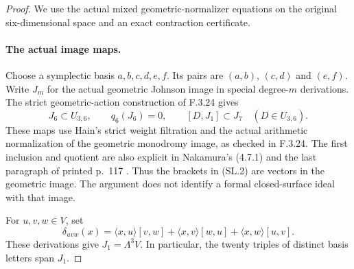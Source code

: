 \begin{proof}
We use the actual mixed geometric-normalizer equations on the original
six-dimensional space and an exact contraction certificate.

\paragraph{The actual image maps.}
Choose a symplectic basis $a,b,c,d,e,f$.
Its pairs are $(a,b)$, $(c,d)$ and $(e,f)$.
Write $J_m$ for the actual geometric Johnson image in special
degree-$m$ derivations. The strict geometric-action construction of
F.3.24 gives
\[
 J_6\subset U_{3,6},\qquad q_6(J_6)=0,\qquad
                  [D,J_1]\subset J_7\quad(D\in U_{3,6}).   \tag{SL.2}
\]
These maps use Hain's strict weight filtration and the actual arithmetic
normalization of the geometric monodromy image, as checked in F.3.24.
The first inclusion and quotient are also explicit in Nakamura's
(4.7.1) and the last paragraph of printed p.~117
\cite{AuditNakamura1996}. Thus the brackets in (SL.2) are vectors in
the geometric image. The argument does not identify a formal
closed-surface ideal with that image.

For $u,v,w\in V$, set
\[
 \delta_{uvw}(x)=\langle x,u\rangle[v,w]
              +\langle x,v\rangle[w,u]
              +\langle x,w\rangle[u,v].
\]
These derivations give $J_1=\Lambda^3V$. In particular, the twenty
triples of distinct basis letters span $J_1$.


\end{proof}

